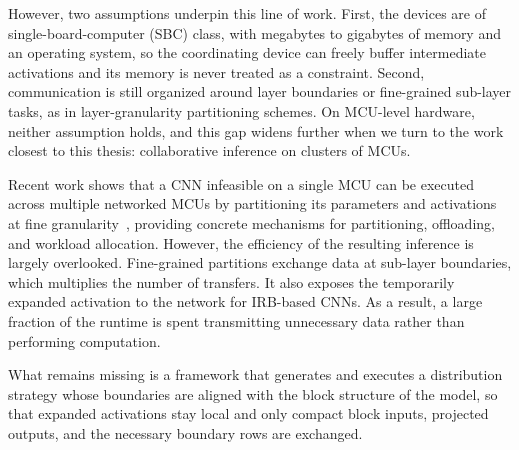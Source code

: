 However, two assumptions underpin this line of work. First, the devices are of
single-board-computer (SBC) class, with megabytes to gigabytes of memory and an
operating system, so the coordinating device can freely buffer intermediate
activations and its memory is never treated as a constraint. Second,
communication is still organized around layer boundaries or fine-grained
sub-layer tasks, as in layer-granularity partitioning
schemes. On MCU-level hardware, neither assumption
holds, and this gap widens further when we turn to the work closest to this
thesis: collaborative inference on clusters of MCUs.

Recent work shows that a CNN infeasible on a single MCU can be executed across
multiple networked MCUs by partitioning its parameters and activations at fine
granularity~\cite{split-cnn}, providing concrete mechanisms for partitioning,
offloading, and workload allocation. 
However, the efficiency of the resulting inference is largely overlooked. Fine-grained partitions exchange data at
sub-layer boundaries, which multiplies the number of transfers. 
It also exposes the temporarily expanded activation to the network for IRB-based CNNs. As a result, a large fraction of the runtime is spent transmitting unnecessary data rather than performing computation.

What remains missing is a framework that generates and executes a distribution
strategy whose boundaries are aligned with the block structure of the model, so
that expanded activations stay local and only compact block inputs, projected
outputs, and the necessary boundary rows are exchanged.







